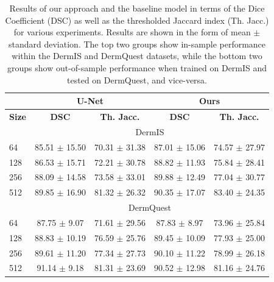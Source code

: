 \begin{table}[h]
\caption{Results of our approach and the baseline model in terms of the Dice Coefficient (DSC) as well as the thresholded Jaccard index (Th. Jacc.) for various experiments. Results are shown in the form of mean $\pm$ standard deviation. The top two groups show in-sample performance within the DermIS and DermQuest datasets, while the bottom two groups show out-of-sample performance when trained on DermIS and tested on DermQuest, and vice-versa.}\label{tab:results}
\def\arraystretch{1.2}
\setlength\tabcolsep{1em}
\begin{tabularx}{\textwidth}{X|cc|cc}
& \multicolumn{2}{c|}{U-Net} & \multicolumn{2}{c}{Ours} \\
\midrule
 \textbf{Size}                                                     & \textbf{DSC}           & \textbf{Th. Jacc.}     & \textbf{DSC}           & \textbf{Th. Jacc.}     \\
\midrule
 &\multicolumn{4}{c}{DermIS}                         \\
\midrule
 64                                                       & 85.51 $\pm$ 15.50 & 70.31 $\pm$ 31.38 & 87.01 $\pm$ 15.06 & 74.57 $\pm$ 27.97 \\
 128                                                      & 86.53 $\pm$ 15.71 & 72.21 $\pm$ 30.78 & 88.82 $\pm$ 11.93 & 75.84 $\pm$ 28.41 \\
 256                                                      & 88.09 $\pm$ 14.58 & 73.58 $\pm$ 33.01 & 89.88 $\pm$ 12.49 & 77.04 $\pm$ 30.77 \\
 512                                                      & 89.85 $\pm$ 16.90 & 81.32 $\pm$ 26.32 & 90.35 $\pm$ 17.07 & 83.40 $\pm$ 24.35 \\
 \midrule
 &\multicolumn{4}{c}{DermQuest}                      \\
\midrule
 64                                                       & 87.75 $\pm$ 9.07  & 71.61 $\pm$ 29.56 & 87.83 $\pm$ 8.97  & 73.96 $\pm$ 25.84 \\
 128                                                      & 88.83 $\pm$ 10.19 & 76.59 $\pm$ 25.76 & 89.45 $\pm$ 10.09 & 77.93 $\pm$ 25.00 \\
 256                                                      & 89.61 $\pm$ 11.20 & 77.34 $\pm$ 27.73 & 90.10 $\pm$ 11.22 & 78.99 $\pm$ 26.18 \\
 512                                                      & 91.14 $\pm$ 9.18  & 81.31 $\pm$ 23.69 & 90.52 $\pm$ 12.98 & 81.16 $\pm$ 24.76 \\

\end{tabularx}
\end{table}
